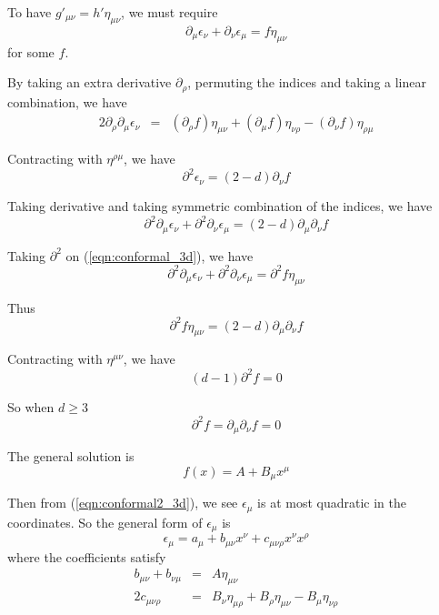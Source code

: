 \documentclass[12pt]{book}
\begin{document}
	To have $g'_{\mu\nu}=h'\eta_{\mu\nu}$, we must require
	\begin{equation}
		\partial_\mu\epsilon_\nu+\partial_\nu\epsilon_\mu=f\eta_{\mu\nu} \label{eqn:conformal_3d}
	\end{equation}
	for some $f$.
	
	By taking an extra derivative $\partial_\rho$, permuting the indices and taking a linear combination, we have
	\begin{eqnarray}
		2\partial_\rho\partial_\mu\epsilon_\nu&=&(\partial_\rho f)\eta_{\mu\nu}+(\partial_\mu f)\eta_{\nu\rho}-(\partial_\nu f)\eta_{\rho\mu} \label{eqn:conformal2_3d}
	\end{eqnarray}
	
	Contracting with $\eta^{\rho\mu}$, we have
	\begin{equation}
		\partial^2\epsilon_\nu=(2-d)\partial_\nu f
	\end{equation}
	
	Taking derivative and taking symmetric combination of the indices, we have
	\begin{equation}
		\partial^2\partial_\mu\epsilon_\nu+\partial^2\partial_\nu\epsilon_\mu=(2-d)\partial_\mu\partial_\nu f
	\end{equation}
	
	Taking $\partial^2$ on (\ref{eqn:conformal_3d}), we have
	\begin{equation}
		\partial^2\partial_\mu\epsilon_\nu+\partial^2\partial_\nu\epsilon_\mu=\partial^2f\eta_{\mu\nu}
	\end{equation}
		
	Thus
	\begin{equation}
		\partial^2f\eta_{\mu\nu}=(2-d)\partial_\mu\partial_\nu f
	\end{equation}
	
	Contracting with $\eta^{\mu\nu}$, we have
	\begin{equation}
		(d-1)\partial^2f=0
	\end{equation}
	
	So when $d\geq3$
	\begin{equation}
		\partial^2f=\partial_\mu\partial_\nu f=0
	\end{equation}
	
	The general solution is
	\begin{equation}
		f(x)=A+B_\mu x^\mu
	\end{equation}
	
	Then from (\ref{eqn:conformal2_3d}), we see $\epsilon_\mu$ is at most quadratic in the coordinates. So the general form of $\epsilon_\mu$ is
	\begin{equation}
		\epsilon_\mu=a_\mu+b_{\mu\nu} x^\nu+c_{\mu\nu\rho}x^\nu x^\rho
	\end{equation}
	where the coefficients satisfy
	\begin{eqnarray}
		b_{\mu\nu}+b_{\nu\mu}&=&A\eta_{\mu\nu}\\
		2c_{\mu\nu\rho}&=&B_\nu\eta_{\mu\rho}+B_\rho\eta_{\mu\nu}-B_\mu\eta_{\nu\rho}
	\end{eqnarray}
	
\end{document}
